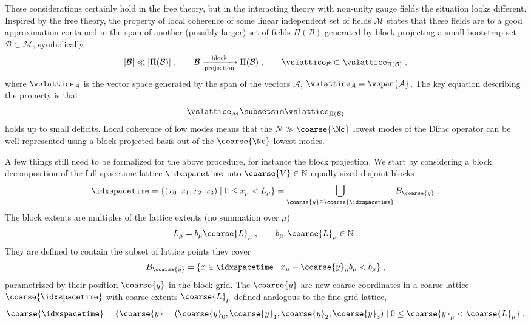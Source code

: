 These considerations certainly hold in the free theory, but in the interacting theory with non-unity gauge fields the situation looks different.
Inspired by the free theory, the property of local coherence of some linear independent set of fields $\mathcal{M}$ states that these fields are to a good approximation contained in the span of another (possibly larger) set of fields $\Pi(\mathcal{B})$ generated by block projecting a small bootstrap set $\mathcal{B} \subset \mathcal{M}$, symbolically
\begin{equation} \label{eq:local:coherence:sets}
\lvert \mathcal{B} \rvert \ll \lvert \Pi(\mathcal{B}) \rvert \;,
\qquad
\mathcal{B} \xrightarrow[\text{projection}]{\text{block}} \Pi(\mathcal{B}) \;,
\qquad
\vslattice_{\mathcal{B}} \subset \vslattice_{\Pi(\mathcal{B})} \;,
\end{equation}
where $\vslattice_{\mathcal{A}}$ is the vector space generated by the span of the vectors $\mathcal{A}$, $\vslattice_{\mathcal{A}} = \vspan{\mathcal{A}}$.
The key equation describing the property is that
\begin{equation} \label{eq:local:coherence:set:approx}
\vslattice_{\mathcal{M}} \subsetsim \vslattice_{\Pi(\mathcal{B})}
\end{equation}
holds up to small deficits.
Local coherence of low modes means that the $N \gg \coarse{\Nc}$ lowest modes of the Dirac operator can be well represented using a block-projected basis out of the $\coarse{\Nc}$ lowest modes.

A few things still need to be formalized for the above procedure, for instance the block projection.
We start by considering a block decomposition of the full spacetime lattice $\idxspacetime$ into $\coarse{V} \in \mathbb{N}$ equally-sized disjoint blocks
\begin{equation} \label{eq:coarse:lattice}
\idxspacetime
= \{ (x_0,x_1,x_2,x_3) \mid 0 \leq x_{\mu} < L_{\mu} \}
= \bigcup_{\coarse{y} \in \coarse{\idxspacetime}} B_{\coarse{y}} \;.
\end{equation}
The block extents are multiples of the lattice extents (no summation over $\mu$)
\begin{equation}
L_{\mu} = b_{\mu} \coarse{L}_{\mu} \;,
\qquad
b_{\mu}, \coarse{L}_{\mu} \in \mathbb{N} \;.
\end{equation}
They are defined to contain the subset of lattice points they cover
\begin{equation}
B_{\coarse{y}} = \{ x \in \idxspacetime \mid x_{\mu} - \coarse{y}_{\mu} b_{\mu} < b_{\mu} \} \;,
\end{equation}
parametrized by their position $\coarse{y}$ in the block grid.
The $\coarse{y}$ are new coarse coordinates in a coarse lattice $\coarse{\idxspacetime}$ with coarse extents $\coarse{L}_{\mu}$ defined analogous to the fine-grid lattice,
\begin{equation}
\coarse{\idxspacetime} = \{ \coarse{y} = (\coarse{y}_0, \coarse{y}_1, \coarse{y}_2, \coarse{y}_3) \mid 0 \leq \coarse{y}_\mu < \coarse{L}_\mu\} \;.
\end{equation}

